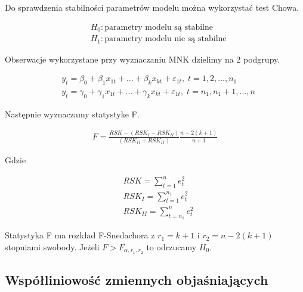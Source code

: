 Do sprawdzenia stabilności parametrów modelu można wykorzystać test Chowa.

\begin{equation}
    \begin{split}
        &H_0: \text{parametry modelu są stabilne} \\
        &H_1: \text{parametry modelu nie są stabilne}
    \end{split}
\end{equation}

Obserwacje wykorzystane przy wyznaczaniu MNK dzielimy na 2 podgrupy.

\begin{equation}
    \begin{split}
        &y_t = \beta_0 + \beta_{1}x_{1t} + \dots + \beta_{k}x_{kt} + \varepsilon_{1t}, \;  t= 1,2, \dots , n_1  \\
        &y_t = \gamma_0 + \gamma_{1}x_{1t} + \dots + \gamma_{k}x_{kt} + \varepsilon_{1t}, \;  t= n_1,n_1 +1, \dots , n
    \end{split}
\end{equation}

Następnie wyznaczamy statystyke F.

\begin{equation}
    \begin{split}
        F = \frac{RSK - (RSK_I - RSK_{II})}{(RSK_{II}  + RSK_{II})} \frac{n-2(k+1)}{n+1}
    \end{split}
\end{equation}

Gdzie

\begin{equation}
    \begin{split}
        &RSK = \sum_{t=1}^{n} e_{t}^{2} \\
        &RSK_{I} = \sum_{t=1}^{n_1} e_{t}^{2} \\
        &RSK_{II} = \sum_{t=n_1}^{n} e_{t}^{2}
    \end{split}
\end{equation}

Statystyka F ma rozkład F-Snedachora z \(r_1=k+1 \) i \(r_2= n -2(k+1) \) stopniami swobody.
Jeżeli \( F > F_{\alpha,r_1,r_2} \) to odrzucamy \(H_{0}\).

\subsection{Współliniowość zmiennych objaśniających}\label{subsec:współliniowość-zmiennych-objaśniających}

